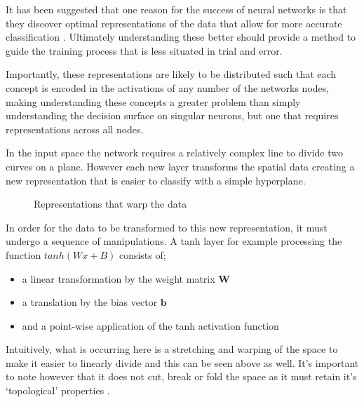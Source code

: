 \documentclass[a4paper,11pt,titlepage]{article}
\begin{document}
		It has been suggested that one reason for the success of neural networks is that they discover optimal representations of the data that allow for more accurate classification \cite{Hinton1986}. Ultimately understanding these better should provide a method to guide the training process that is less situated in trial and error.
		\par
		 Importantly, these representations are likely to be distributed \cite{Hinton1986} such that each concept is encoded in the activations of any number of the networks nodes, making understanding these concepts a greater problem than simply understanding the decision surface on singular neurons, but one that requires representations across all nodes.
		 \par 
	In the input space the network requires a relatively complex line to divide two curves on a plane. However each new layer transforms the spatial data creating a new representation that is easier to classify with a simple hyperplane.
				
		\begin{figure}[H]
    			\centering	
    			\qquad
    			\caption{Representations that warp the data}%
		\end{figure}		
		
		\par 
		In order for the data to be transformed to this new representation, it must undergo a sequence of manipulations. A tanh layer for example processing the function $ tanh(Wx + B) $ consists of; 
		\begin{itemize}
			\item a linear transformation by the weight matrix $ \bm{W} $
			\item a translation by the bias vector $ \bm{b} $
			\item and a point-wise application of the tanh activation function
		\end{itemize}
		Intuitively, what is occurring here is a stretching and warping of the space to make it easier to linearly divide and this can be seen above as well. It's important to note however that it does not cut, break or fold the space as it must retain it's `topological' properties \cite{Choi2005}.
		\par 
								
\end{document}
